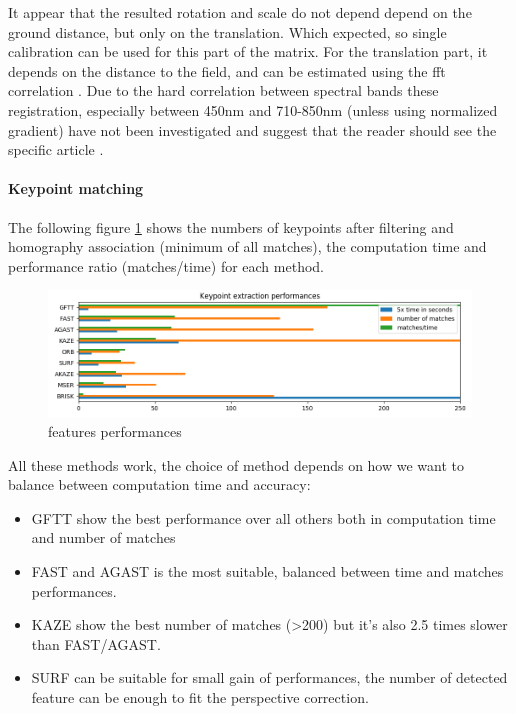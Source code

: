 \documentclass[]{elsarticle}
\begin{document}
	It appear that the resulted rotation and scale do not depend depend on the ground distance, but only on the translation.
	Which expected, so single calibration can be used for this part of the matrix.
	For the translation part, it depends on the distance to the field, and can be estimated using the fft correlation \cite{506761}.
	Due to the hard correlation between spectral bands these registration, especially between 450nm and 710-850nm (unless using normalized gradient)
	have not been investigated and suggest that the reader should see the specific article \cite{rabatel:hal-01684135}.
	
	
	\paragraph{Keypoint matching} 
	The following figure \ref{fig:features-performances} shows the numbers of keypoints after filtering and homography association (minimum of all matches),
	the computation time and performance ratio (matches/time) for each method.
	
	\begin{figure}[!htb]
		\centering
		\includegraphics[width=\linewidth]{../figures/comparaison-keypoint-performances.png}
		\caption{features performances}
		\label{fig:features-performances}
	\end{figure}
	
	\noindent
	All these methods work, the choice of method depends on how we want to balance between computation time and accuracy:
	\begin{itemize}
		\item GFTT show the best performance over all others both in computation time and number of matches
		\item FAST and AGAST is the most suitable, balanced between time and matches performances.
		\item KAZE show the best number of matches (>200) but it's also 2.5 times slower than FAST/AGAST.
		\item SURF can be suitable for small gain of performances, the number of detected feature can be enough to fit the perspective correction.
	\end{itemize}
	
\end{document}
